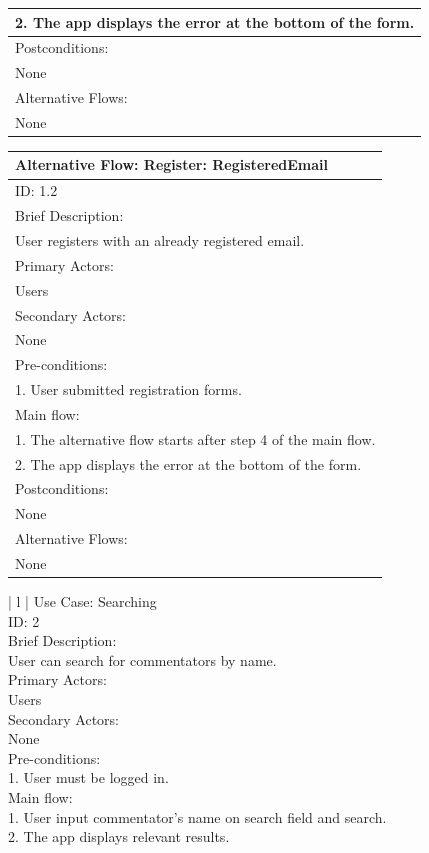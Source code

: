 \documentclass{article}
\begin{document}
\begin{flushleft}
\begin{longtable}[l]{| l |}
2. The app displays the error at the bottom of the form.\\
\hline
Postconditions:\\
None\\
\hline
Alternative Flows:\\
None\\
\hline
\end{longtable}
\begin{longtable}[l]{| l |}
\hline
Alternative Flow: Register: RegisteredEmail\\
\hline
ID: 1.2\\
\hline
Brief Description: \\
User registers with an already registered email.\\
\hline
Primary Actors:\\
Users\\
\hline
Secondary Actors:\\
None\\
\hline
Pre-conditions:\\
1. User submitted registration forms.\\
\hline
Main flow:\\
1. The alternative flow starts after step 4 of the main flow.\\
2. The app displays the error at the bottom of the form.\\
\hline
Postconditions:\\
None\\
\hline
Alternative Flows:\\
None\\
\hline
\end{longtable}
\begin{longtable}[l]{| l |}
\hline
{} {Use Case: Searching}\\
\hline
ID: 2\\
\hline
Brief Description: \\
User can search for commentators by name.\\
\hline
Primary Actors:\\
Users\\
\hline
Secondary Actors:\\
None\\
\hline
Pre-conditions:\\
1. User must be logged in.\\
\hline
Main flow:\\
1. User input commentator’s name on search field and search.\\
2. The app displays relevant results.\\

\end{longtable}
\end{flushleft}
\end{document}

